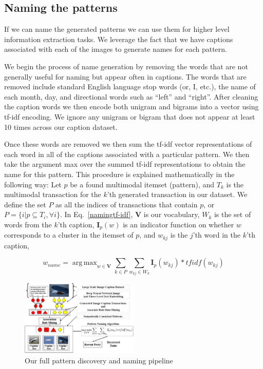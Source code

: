 \documentclass[10pt,twocolumn,letterpaper]{article}
\DeclareMathOperator*{\argmax}{arg\,max}
\begin{document}
{\subsection{Naming the patterns}
If we can name the generated patterns we can use them for higher level information extraction tasks.
We leverage the fact that we have captions associated with each of the images to generate names for each pattern.

We begin the process of name generation by removing the words that are not generally useful for naming but appear often in captions.
The words that are removed include standard English language stop words (or, I, etc.), the name of each month, day, and directional words such as ``left'' and ``right''.
After cleaning the caption words we then encode both unigram and bigrams into a vector using tf-idf encoding.
We ignore any unigram or bigram that does not appear at least 10 times across our caption dataset.

Once these words are removed we then sum the tf-idf vector representations of each word in all of the captions associated with a particular pattern.
We then take the argument max over the summed tf-idf representations to obtain the name for this pattern.
This procedure is explained mathematically in the following way:
Let $p$ be a found multimodal itemset (pattern), and $T_k$ is the multimodal transaction for the $k$'th generated transaction in our dataset.
We define the set $P$ as all the indices of transactions that contain $p$, or $P = \{i|p \subseteq T_i, \forall i\}$.
In Eq.~\ref{namingtf-idf}, $\mathbf{V}$ is our vocabulary, $W_k$ is the set of words from the $k$'th caption, $\mathbf{I}_p(w)$ is an indicator function on whether $w$ corresponds to a cluster in the itemset of $p$, and $w_{kj}$ is the $j$'th word in the $k$'th caption,

\begin{equation}
w_{name} = \argmax_{w \in \mathbf{V}} \sum_{k \in P} \sum_{w_{kj} \in W_k} \mathbf{I}_p(w_{kj})*tfidf(w_{kj})
\label{namingtf-idf}
\end{equation}

\begin{figure}[t]
  \centering
  \includegraphics[width=0.5\textwidth]{imgs/naming_pipeline3.png}
  \caption{Our full pattern discovery and naming pipeline}
  \label{fig:naming_pipeline}
\end{figure}

}
\end{document}
